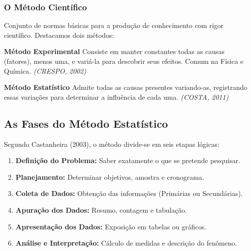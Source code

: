 \documentclass[
  letterpaper,
  DIV=11,
  numbers=noendperiod]{scrreprt}
\providecommand{\tightlist}{%
  \setlength{\itemsep}{0pt}\setlength{\parskip}{0pt}}\usepackage{longtable,booktabs,array}
\begin{document}
\subsubsection{O Método Científico}\label{o-muxe9todo-cientuxedfico}

Conjunto de normas básicas para a produção de conhecimento com rigor
científico. Destacamos dois métodos:

\begin{tcolorbox}[enhanced jigsaw, colframe=quarto-callout-note-color-frame, colback=white, bottomrule=.15mm, bottomtitle=1mm, toptitle=1mm, opacitybacktitle=0.6, arc=.35mm, breakable, rightrule=.15mm, colbacktitle=quarto-callout-note-color!10!white, titlerule=0mm, leftrule=.75mm, title={Nota}, toprule=.15mm, left=2mm, opacityback=0, coltitle=black]

\textbf{Método Experimental} Consiste em manter constantes todas as
causas (fatores), menos uma, e variá-la para descobrir seus efeitos.
Comum na Física e Química. \emph{(CRESPO, 2002)}

\end{tcolorbox}

\begin{tcolorbox}[enhanced jigsaw, colframe=quarto-callout-note-color-frame, colback=white, bottomrule=.15mm, bottomtitle=1mm, toptitle=1mm, opacitybacktitle=0.6, arc=.35mm, breakable, rightrule=.15mm, colbacktitle=quarto-callout-note-color!10!white, titlerule=0mm, leftrule=.75mm, title={Nota}, toprule=.15mm, left=2mm, opacityback=0, coltitle=black]

\textbf{Método Estatístico} Admite todas as causas presentes
variando-as, registrando essas variações para determinar a influência de
cada uma. \emph{(COSTA, 2011)}

\end{tcolorbox}

\subsection{As Fases do Método
Estatístico}\label{as-fases-do-muxe9todo-estatuxedstico}

Segundo Castanheira (2003), o método divide-se em seis etapas lógicas:

\begin{enumerate}
\def\labelenumi{\arabic{enumi}.}
\tightlist
\item
  \textbf{Definição do Problema:} Saber exatamente o que se pretende
  pesquisar.
\item
  \textbf{Planejamento:} Determinar objetivos, amostra e cronograma.
\item
  \textbf{Coleta de Dados:} Obtenção das informações (Primárias ou
  Secundárias).
\item
  \textbf{Apuração dos Dados:} Resumo, contagem e tabulação.
\item
  \textbf{Apresentação dos Dados:} Exposição em tabelas ou gráficos.
\item
  \textbf{Análise e Interpretação:} Cálculo de medidas e descrição do
  fenômeno.
\end{enumerate}
\end{document}

